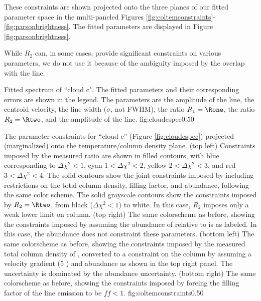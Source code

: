 These constraints are shown projected onto the three planes of our fitted
parameter space in the multi-paneled Figures
\ref{fig:coltemconstraints}-\ref{fig:parsonbrightness}.  The fitted parameters
are displayed in Figure \ref{fig:parsonbrightness}.

While $R_2$ can, in some cases, provide significant constraints on various
parameters, we do not use it because of the ambiguity imposed by the overlap
with the \methanol \fourtwotwo line.

{Fitted spectrum of ``cloud c".  The fitted parameters and their corresponding
errors are shown in the legend.  The parameters are the amplitude of the
\formaldehyde \threeohthree line, the centroid velocity, the line width
($\sigma$, not FWHM), the ratio $R_1 = \Rone$,
the ratio $R_2 = \Rtwo$, and the amplitude of
the \methanol \fourtwotwo line.  }
{fig:cloudcspec}{0.5}{0}

{The parameter constraints for ``cloud c'' (Figure \ref{fig:cloudcspec})
projected (marginalized) onto the temperature/column density plane.\newline
(top left) Constraints imposed by the measured ratio \Rone are shown in filled contours,
with blue corresponding to $\Delta\chi^2 < 1$, cyan $1 < \Delta\chi^2 < 2$,
yellow $2 < \Delta\chi^2 < 3$, and red $3 < \Delta\chi^2 < 4$.  The solid
contours show the joint constraints imposed by including restrictions on the
total column density, filling factor, and abundance, following the same color
scheme.  The solid grayscale contours show the constraints imposed by
$R_2=\Rtwo$, from black ($\Delta\chi^2 < 1$) to white.  In this case, $R_2$
imposes only a weak lower limit on column. \newline
(top right) The same colorscheme as before, showing the constraints imposed by
assuming the abundance of \para relative to \hh is as labeled.  In this case,
the abundance does not constraint these parameters. \newline
(bottom left) The same colorscheme as before, showing the constraints imposed
by the measured total column density of \hh, converted to a constraint on the
\para column by assuming a velocity gradient (5 \kms \perpc) and abundance as
shown in the top right panel.  The uncertainty is dominated by the abundance
uncertainty.  \newline
(bottom right) The same colorscheme as before, showing the constraints imposed
by forcing the filling factor of the line emission to be $ff < 1$.
}
{fig:coltemconstraints}{0.5}{0}

